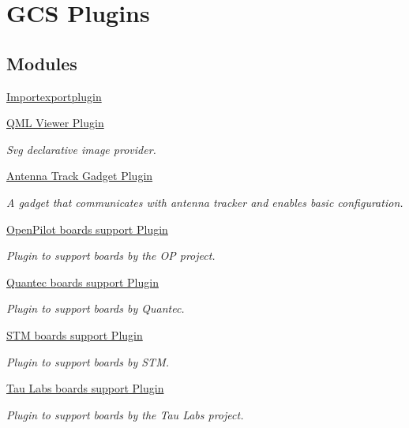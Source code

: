 \hypertarget{group___g_c_s_plugins}{\section{\-G\-C\-S \-Plugins}
\label{group___g_c_s_plugins}
}
\subsection*{\-Modules}
\begin{DoxyCompactItemize}
\item 
\hyperlink{group__importexportplugin}{\-Importexportplugin}
\item 
\hyperlink{group___o_p_map_plugin}{\-Q\-M\-L Viewer Plugin}
\begin{DoxyCompactList}\small\item\em \-Svg declarative image provider. \end{DoxyCompactList}\item 
\hyperlink{group___antenna_track_gadget_plugin}{\-Antenna Track Gadget Plugin}
\begin{DoxyCompactList}\small\item\em \-A gadget that communicates with antenna tracker and enables basic configuration. \end{DoxyCompactList}\item 
\hyperlink{group___boards___open_pilot_plugin}{\-Open\-Pilot boards support Plugin}
\begin{DoxyCompactList}\small\item\em \-Plugin to support boards by the \-O\-P project. \end{DoxyCompactList}\item 
\hyperlink{group___boards___quantec}{\-Quantec boards support Plugin}
\begin{DoxyCompactList}\small\item\em \-Plugin to support boards by \-Quantec. \end{DoxyCompactList}\item 
\hyperlink{group___boards___stm}{\-S\-T\-M boards support Plugin}
\begin{DoxyCompactList}\small\item\em \-Plugin to support boards by \-S\-T\-M. \end{DoxyCompactList}\item 
\hyperlink{group___boards___tau_labs_plugin}{\-Tau Labs boards support Plugin}
\begin{DoxyCompactList}\small\item\em \-Plugin to support boards by the \-Tau \-Labs project. \end{DoxyCompactList}\item 

\end{DoxyCompactItemize}
